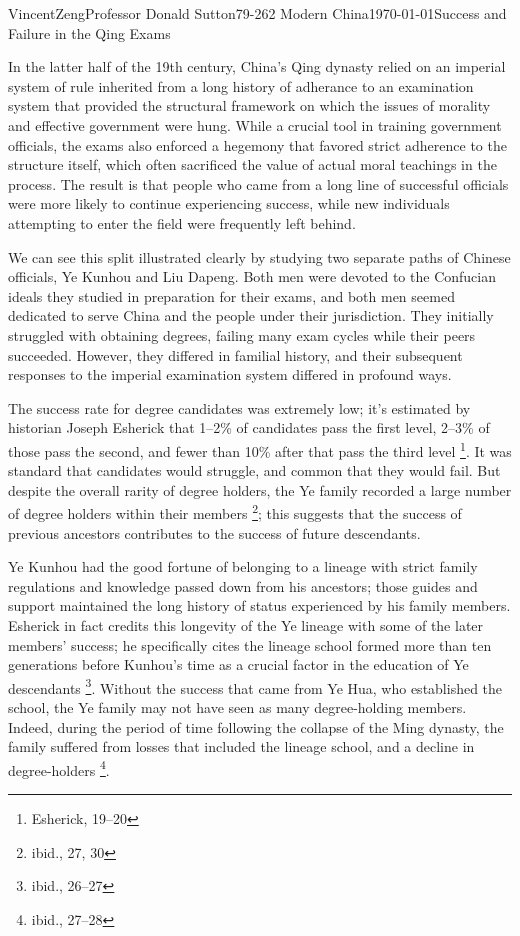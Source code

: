\documentclass[12pt]{article}
\begin{document}
\begin{mla}{Vincent}{Zeng}{Professor Donald Sutton}{79-262 Modern China}{\today}{Success and Failure in the Qing Exams}

In the latter half of the 19th century, China's Qing dynasty relied on an
imperial system of rule inherited from a long history of adherance to an
examination system that provided the structural framework on which the issues
of morality and effective government were hung. While a crucial tool in
training government officials, the exams also enforced a hegemony that
favored strict adherence to the structure itself, which often sacrificed
the value of actual moral teachings in the process. The result is that people who
came from a long line of successful officials were more likely to continue
experiencing success, while new individuals attempting to enter the field were
frequently left behind.

We can see this split illustrated clearly by studying two separate paths of
Chinese officials, Ye Kunhou and Liu Dapeng. Both men were devoted to the
Confucian ideals they studied in preparation for their exams, and both men
seemed dedicated to serve China and the people under their jurisdiction. They
initially struggled with obtaining degrees, failing many exam cycles while
their peers succeeded.  However, they differed in familial history, and their
subsequent responses to the imperial examination system differed in profound
ways. 

The success rate for degree candidates was extremely low; it's estimated by
historian Joseph Esherick that 1--2\% of candidates pass the first level,
2--3\% of those pass the second, and fewer than 10\% after that pass the third
level \footnote{Esherick, 19--20}. It was standard that candidates would
struggle, and common that they would fail. But despite the overall rarity of
degree holders, the Ye family recorded a large number of degree holders within
their members \footnote{ibid., 27, 30}; this suggests that the success of
previous ancestors contributes to the success of future descendants. 

Ye Kunhou had the good fortune of belonging to a lineage with strict family
regulations and knowledge passed down from his ancestors; those guides and
support maintained the long history of status experienced by his family members.
Esherick in fact credits this longevity of the Ye lineage with some of the later
members' success; he specifically cites the lineage school formed more than
ten generations before Kunhou's time as a crucial factor in the education of Ye
descendants \footnote{ibid., 26--27}. Without the success that came from Ye
Hua, who established the school, the Ye family may not have seen as many
degree-holding members. Indeed, during the period of time following the
collapse of the Ming dynasty, the family suffered from losses that included
the lineage school, and a decline in degree-holders \footnote{ibid., 27--28}.


\end{mla}
\end{document}
